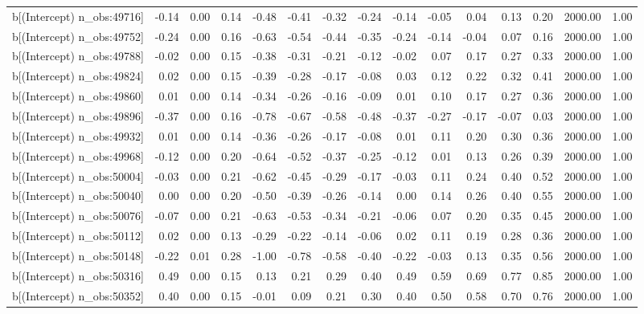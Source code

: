 \begin{table}[ht]
\begin{tabular}{rrrrrrrrrrrrrrr}
  b[(Intercept) n\_obs:49716] & -0.14 & 0.00 & 0.14 & -0.48 & -0.41 & -0.32 & -0.24 & -0.14 & -0.05 & 0.04 & 0.13 & 0.20 & 2000.00 & 1.00 \\ 
  b[(Intercept) n\_obs:49752] & -0.24 & 0.00 & 0.16 & -0.63 & -0.54 & -0.44 & -0.35 & -0.24 & -0.14 & -0.04 & 0.07 & 0.16 & 2000.00 & 1.00 \\ 
  b[(Intercept) n\_obs:49788] & -0.02 & 0.00 & 0.15 & -0.38 & -0.31 & -0.21 & -0.12 & -0.02 & 0.07 & 0.17 & 0.27 & 0.33 & 2000.00 & 1.00 \\ 
  b[(Intercept) n\_obs:49824] & 0.02 & 0.00 & 0.15 & -0.39 & -0.28 & -0.17 & -0.08 & 0.03 & 0.12 & 0.22 & 0.32 & 0.41 & 2000.00 & 1.00 \\ 
  b[(Intercept) n\_obs:49860] & 0.01 & 0.00 & 0.14 & -0.34 & -0.26 & -0.16 & -0.09 & 0.01 & 0.10 & 0.17 & 0.27 & 0.36 & 2000.00 & 1.00 \\ 
  b[(Intercept) n\_obs:49896] & -0.37 & 0.00 & 0.16 & -0.78 & -0.67 & -0.58 & -0.48 & -0.37 & -0.27 & -0.17 & -0.07 & 0.03 & 2000.00 & 1.00 \\ 
  b[(Intercept) n\_obs:49932] & 0.01 & 0.00 & 0.14 & -0.36 & -0.26 & -0.17 & -0.08 & 0.01 & 0.11 & 0.20 & 0.30 & 0.36 & 2000.00 & 1.00 \\ 
  b[(Intercept) n\_obs:49968] & -0.12 & 0.00 & 0.20 & -0.64 & -0.52 & -0.37 & -0.25 & -0.12 & 0.01 & 0.13 & 0.26 & 0.39 & 2000.00 & 1.00 \\ 
  b[(Intercept) n\_obs:50004] & -0.03 & 0.00 & 0.21 & -0.62 & -0.45 & -0.29 & -0.17 & -0.03 & 0.11 & 0.24 & 0.40 & 0.52 & 2000.00 & 1.00 \\ 
  b[(Intercept) n\_obs:50040] & 0.00 & 0.00 & 0.20 & -0.50 & -0.39 & -0.26 & -0.14 & 0.00 & 0.14 & 0.26 & 0.40 & 0.55 & 2000.00 & 1.00 \\ 
  b[(Intercept) n\_obs:50076] & -0.07 & 0.00 & 0.21 & -0.63 & -0.53 & -0.34 & -0.21 & -0.06 & 0.07 & 0.20 & 0.35 & 0.45 & 2000.00 & 1.00 \\ 
  b[(Intercept) n\_obs:50112] & 0.02 & 0.00 & 0.13 & -0.29 & -0.22 & -0.14 & -0.06 & 0.02 & 0.11 & 0.19 & 0.28 & 0.36 & 2000.00 & 1.00 \\ 
  b[(Intercept) n\_obs:50148] & -0.22 & 0.01 & 0.28 & -1.00 & -0.78 & -0.58 & -0.40 & -0.22 & -0.03 & 0.13 & 0.35 & 0.56 & 2000.00 & 1.00 \\ 
  b[(Intercept) n\_obs:50316] & 0.49 & 0.00 & 0.15 & 0.13 & 0.21 & 0.29 & 0.40 & 0.49 & 0.59 & 0.69 & 0.77 & 0.85 & 2000.00 & 1.00 \\ 
  b[(Intercept) n\_obs:50352] & 0.40 & 0.00 & 0.15 & -0.01 & 0.09 & 0.21 & 0.30 & 0.40 & 0.50 & 0.58 & 0.70 & 0.76 & 2000.00 & 1.00 \\ 

\end{tabular}
\end{table}
